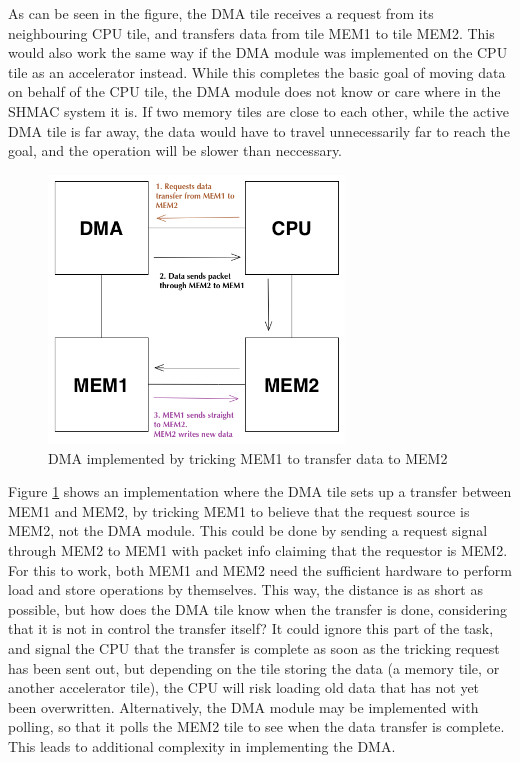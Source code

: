 As can be seen in the figure, the DMA tile receives a request from its neighbouring CPU tile, and transfers data from tile MEM1 to tile MEM2.
This would also work the same way if the DMA module was implemented on the CPU tile as an accelerator instead.
While this completes the basic goal of moving data on behalf of the CPU tile, the DMA module does not know or care where in the SHMAC system it is.
If two memory tiles are close to each other, while the active DMA tile is far away, the data would have to travel unnecessarily far to reach the goal, and the operation will be slower than neccessary.

\begin{figure}[h!]
    \centering
    \includegraphics[width=0.7\textwidth]{Figures/DMA/DMASHMAC2}
    \caption{DMA implemented by tricking MEM1 to transfer data to MEM2}
    \label{fig:DMASHMAC2}
\end{figure}

Figure \ref{fig:DMASHMAC2} shows an implementation where the DMA tile sets up a transfer between MEM1 and MEM2, by tricking MEM1 to believe that the request source is MEM2, not the DMA module.
This could be done by sending a request signal through MEM2 to MEM1 with packet info claiming that the requestor is MEM2.
For this to work, both MEM1 and MEM2 need the sufficient hardware to perform load and store operations by themselves.
This way, the distance is as short as possible, but how does the DMA tile know when the transfer is done, considering that it is not in control the transfer itself?
It could ignore this part of the task, and signal the CPU that the transfer is complete as soon as the tricking request has been sent out, but depending on the tile storing the data (a memory tile, or another accelerator tile), the CPU will risk loading old data that has not yet been overwritten.
Alternatively, the DMA module may be implemented with polling, so that it polls the MEM2 tile to see when the data transfer is complete.
This leads to additional complexity in implementing the DMA.
 
